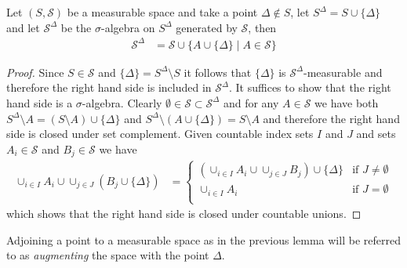 \begin{lem}\label{AugmentingMeasurableSpace}Let $(S, \mathcal{S})$ be a measurable space and take a point $\Delta \notin S$, let $S^{\Delta} = S \cup \lbrace \Delta \rbrace$ and let $\mathcal{S}^\Delta$ be the $\sigma$-algebra on $S^\Delta$ generated by $\mathcal{S}$, then 
\begin{align*}
\mathcal{S}^\Delta &= \mathcal{S} \cup \lbrace A \cup \lbrace \Delta \rbrace \mid A \in \mathcal{S}\rbrace
\end{align*}
\end{lem}
\begin{proof}
Since $S \in \mathcal{S}$ and $\lbrace \Delta \rbrace = S^\Delta \setminus S$ it follows that $\lbrace \Delta \rbrace$ is $\mathcal{S}^\Delta$-measurable and therefore the right hand side is included in $\mathcal{S}^\Delta$.  It suffices to show that the right hand side is a $\sigma$-algebra.  Clearly $\emptyset \in \mathcal{S} \subset \mathcal{S}^\Delta$ and for any $A \in \mathcal{S}$ we have both $S^\Delta \setminus A = (S\setminus A) \cup \lbrace \Delta \rbrace$ and $S^\Delta \setminus (A \cup \lbrace \Delta \rbrace) = S \setminus A$ and therefore the right hand side is closed under set complement.  Given countable index sets $I$ and $J$ and sets $A_i \in \mathcal{S}$ and $B_j \in \mathcal{S}$ we have
\begin{align*}
\cup_{i \in I} A_i \cup \cup_{j \in J} (B_j \cup \lbrace \Delta \rbrace) &=
\begin{cases}
(\cup_{i \in I} A_i \cup \cup_{j \in J} B_j) \cup \lbrace \Delta \rbrace & \text{if $J \neq \emptyset$} \\
\cup_{i \in I} A_i & \text{if $J = \emptyset$} \\
\end{cases}
\end{align*}
which shows that the right hand side is closed under countable unions. 
\end{proof}
Adjoining a point to a measurable space as in the previous lemma will be referred to as \emph{augmenting} the space with the point $\Delta$.

